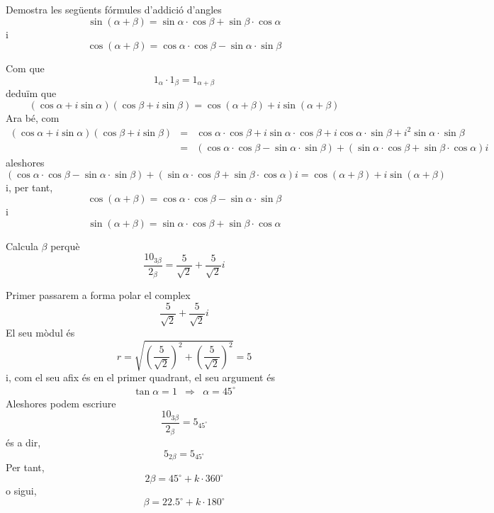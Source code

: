 \begin{exercici}
Demostra les següents fórmules d’addició d’angles
\[
\sin (\alpha +\beta )=\sin \alpha \cdot \cos \beta +\sin \beta \cdot \cos
\alpha
\]
i
\[
\cos (\alpha +\beta )=\cos \alpha \cdot \cos \beta -\sin \alpha \cdot \sin
\beta
\]
\end{exercici}

\begin{solucio}
Com que
\[
1_{\alpha }\cdot 1_{\beta }=1_{\alpha +\beta }
\]
deduïm que
\[
(\cos \alpha +i\sin \alpha )(\cos \beta +i\sin \beta )=\cos (\alpha +\beta
)+i\sin (\alpha +\beta )
\]
Ara bé, com
\begin{eqnarray*}
(\cos \alpha +i\sin \alpha )(\cos \beta +i\sin \beta ) &=&\cos \alpha \cdot
\cos \beta +i\sin \alpha \cdot \cos \beta +i\cos \alpha \cdot \sin \beta
+i^{2}\sin \alpha \cdot \sin \beta \\
&=&(\cos \alpha \cdot \cos \beta -\sin \alpha \cdot \sin \beta )+(\sin
\alpha \cdot \cos \beta +\sin \beta \cdot \cos \alpha )i
\end{eqnarray*}
aleshores
\[
(\cos \alpha \cdot \cos \beta -\sin \alpha \cdot \sin \beta )+(\sin \alpha
\cdot \cos \beta +\sin \beta \cdot \cos \alpha )i=\cos (\alpha +\beta
)+i\sin (\alpha +\beta )
\]
i, per tant,
\[
\cos (\alpha +\beta )=\cos \alpha \cdot \cos \beta -\sin \alpha \cdot \sin
\beta
\]
i
\[
\sin (\alpha +\beta )=\sin \alpha \cdot \cos \beta +\sin \beta \cdot \cos
\alpha
\]
\end{solucio}

\begin{exercici}
Calcula $\beta $ perquè
\[
\frac{10_{3\beta }}{2_{\beta }}=\frac{5}{\sqrt{2}}+\frac{5}{\sqrt{2}}i
\]
\end{exercici}

\begin{solucio}
Primer passarem a forma polar el complex
\[
\frac{5}{\sqrt{2}}+\frac{5}{\sqrt{2}}i
\]
El seu mòdul és
\[
r=\sqrt{\left( \frac{5}{\sqrt{2}}\right) ^{2}+\left( \frac{5}{\sqrt{2}}
\right) ^{2}}=5
\]
i, com el seu afix és en el primer quadrant, el seu argument és
\[
\begin{array}{lll}
\tan \alpha =1 & \Longrightarrow & \alpha =45
^{\circ}
\end{array}
\]
Aleshores podem escriure
\[
\frac{10_{3\beta }}{2_{\beta }}=5_{45
^{\circ}
}
\]
és a dir,
\[
5_{2\beta }=5_{45
^{\circ}
}
\]
Per tant,
\[
2\beta =45
^{\circ}
+k\cdot 360
^{\circ}
\]
o sigui,
\[
\beta =22.5
^{\circ}
+k\cdot 180
^{\circ}
\]
\end{solucio}

